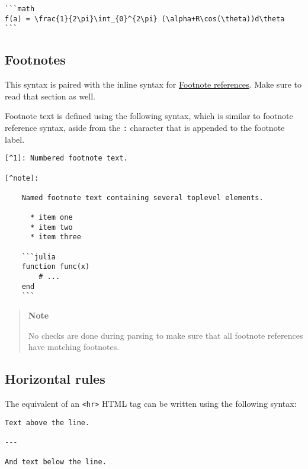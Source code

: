 \begin{verbatim}
```math
f(a) = \frac{1}{2\pi}\int_{0}^{2\pi} (\alpha+R\cos(\theta))d\theta
```
\end{verbatim}



\hypertarget{1021238270223877775}{}


\subsection{Footnotes}



This syntax is paired with the inline syntax for \hyperlink{1545049731521220959}{Footnote references}. Make sure to read that section as well.



Footnote text is defined using the following syntax, which is similar to footnote reference syntax, aside from the \texttt{:} character that is appended to the footnote label.




\begin{lstlisting}
[^1]: Numbered footnote text.

[^note]:

    Named footnote text containing several toplevel elements.

      * item one
      * item two
      * item three

    ```julia
    function func(x)
        # ...
    end
    ```
\end{lstlisting}



\begin{quote}
\textbf{Note}

No checks are done during parsing to make sure that all footnote references have matching footnotes.

\end{quote}


\hypertarget{5663489325501471007}{}


\subsection{Horizontal rules}



The equivalent of an \texttt{<hr>} HTML tag can be written using the following syntax:




\begin{lstlisting}
Text above the line.

---

And text below the line.
\end{lstlisting}



